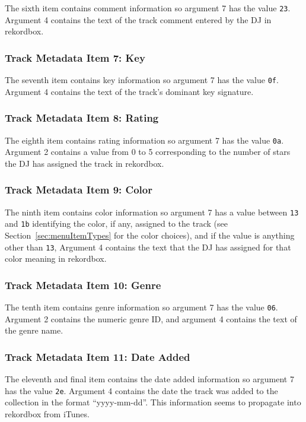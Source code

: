 \documentclass[11pt]{article}
\begin{document}
The sixth item contains comment information so argument 7 has the
value {\tt 23}. Argument 4 contains the text of the track comment
entered by the DJ in rekordbox.

\subsubsection{Track Metadata Item 7: Key}

The seventh item contains key information so argument 7 has the value
{\tt 0f}. Argument 4 contains the text of the track's dominant key
signature.

\subsubsection{Track Metadata Item 8: Rating}

The eighth item contains rating information so argument 7 has the
value {\tt 0a}. Argument 2 contains a value from 0 to 5
corresponding to the number of stars the DJ has assigned the track in
rekordbox.

\subsubsection{Track Metadata Item 9: Color}

The ninth item contains color information so argument 7 has a value
between {\tt 13} and {\tt 1b} identifying the color, if any, assigned
to the track (see Section~\ref{sec:menuItemTypes} for the color
choices), and if the value is anything other than {\tt 13}, Argument
4 contains the text that the DJ has assigned for that color meaning in
rekordbox.

\subsubsection{Track Metadata Item 10: Genre}

The tenth item contains genre information so argument 7 has the value
{\tt 06}. Argument 2 contains the numeric genre ID, and argument 4
contains the text of the genre name.

\subsubsection{Track Metadata Item 11: Date Added}

The eleventh and final item contains the date added information so
argument 7 has the value {\tt 2e}. Argument 4 contains the date the
track was added to the collection in the format ``yyyy-mm-dd''. This
information seems to propagate into rekordbox from iTunes.
\end{document}
